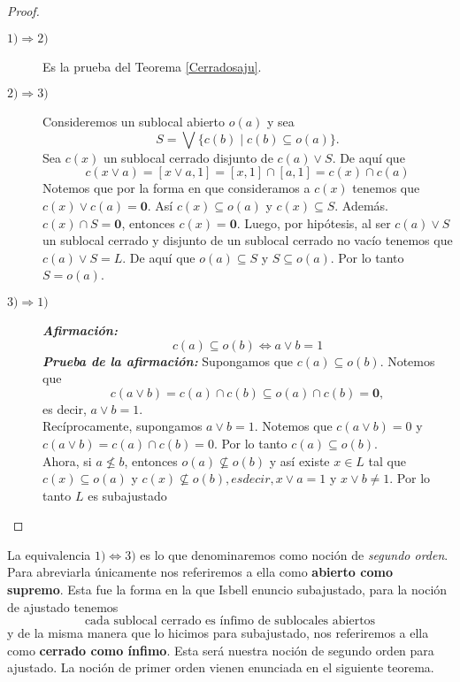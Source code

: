 \documentclass{comunicaciones}
\begin{document}
\begin{proof}
    \begin{description}
        \item[$1)\Rightarrow 2)$] Es la prueba del Teorema \ref{Cerradosaju}.
        \item[$2)\Rightarrow 3)$] Consideremos un sublocal abierto $o(a)$ y sea 
        \[
        S=\bigvee\{c(b)\mid c(b)\subseteq o(a)\}.
        \]
        Sea $c(x)$ un sublocal cerrado disjunto de $c(a)\vee S$. De aquí que 
        \[
        c(x\vee a)=[x\vee a, 1]=[x, 1]\cap [a, 1]=c(x)\cap c(a)
        \]
        Notemos que por la forma en que consideramos a $c(x)$ tenemos que $c(x)\vee c(a)=\mathbf{0}$. Así $c(x)\subseteq o(a)$ y $c(x)\subseteq S$. Además. $c(x)\cap S=\mathbf{0}$, entonces $c(x)=\mathbf{0}$. Luego, por hipótesis, al ser $c(a)\vee S$ un sublocal cerrado y disjunto de un sublocal cerrado no vacío tenemos que $c(a)\vee S=L$. De aquí que $o(a)\subseteq S$ y $S\subseteq o(a)$. Por lo tanto $S=o(a)$.
        \item[$3)\Rightarrow 1)$] \emph{\textbf{Afirmación:}} 
        \begin{equation}\label{c(a)yo(b)}
            c(a)\subseteq o(b)\Leftrightarrow a\vee b=1
        \end{equation}
        \emph{\textbf{Prueba de la afirmación:}} Supongamos que $c(a)\subseteq o(b)$. Notemos que 
        \[
        c(a\vee b)=c(a)\cap c(b)\subseteq o(a)\cap c(b)=\mathbf{0},
        \]
        es decir, $a\vee b=1$.\\

        \noindent
        Recíprocamente, supongamos $a\vee b=1$. Notemos que $c(a\vee b)=0$ y $c(a\vee b)=c(a)\cap c(b)=0$. Por lo tanto $c(a)\subseteq o(b)$.\\

        Ahora, si $a\nleq b$, entonces $o(a)\nsubseteq o(b)$ y así existe $x\in L$ tal que $c(x)\subseteq o(a)$ y $c(x)\nsubseteq o(b), es decir, x\vee a=1$ y $x\vee b\neq 1$. Por lo tanto $L$ es subajustado
    \end{description}
\end{proof}

La equivalencia $1)\Leftrightarrow 3)$ es lo que denominaremos como noción de \emph{segundo orden}. Para abreviarla únicamente nos referiremos a ella como \textbf{abierto como supremo}. Esta fue la forma en la que Isbell enuncio subajustado, para la noción de ajustado tenemos 
\[
\mbox{cada sublocal cerrado es ínfimo de sublocales abiertos}
\]
y de la misma manera que lo hicimos para subajustado, nos referiremos a ella como \textbf{cerrado como ínfimo}. Esta será nuestra noción de segundo orden para ajustado. La noción de primer orden vienen enunciada en el siguiente teorema.
\end{document}
